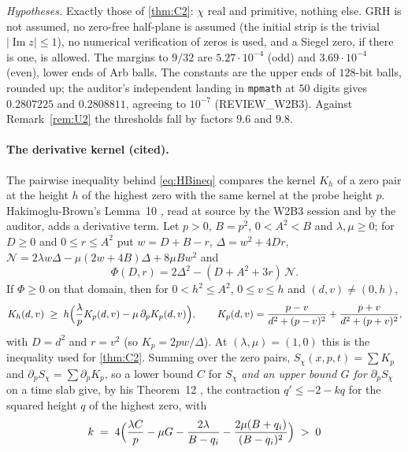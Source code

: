 \documentclass[11pt]{article}
\theoremstyle{definition}
\newcommand{\lean}[1]{\texttt{#1}}
\newcommand{\im}{\operatorname{Im}}
\begin{document}
\noindent
\emph{Hypotheses.} Exactly those of \cref{thm:C2}: $\chi$ real and primitive, nothing else. GRH is not assumed, no zero-free half-plane is assumed (the initial strip is the trivial $|\im z| \le 1$), no numerical verification of zeros is used, and a Siegel zero, if there is one, is allowed. The margins to $9/32$ are $5.27\cdot10^{-4}$ (odd) and $3.69\cdot10^{-4}$ (even), lower ends of Arb balls. The constants are the upper ends of $128$-bit balls, rounded up; the auditor's independent landing in \lean{mpmath} at $50$ digits gives $0.2807225$ and $0.2808811$, agreeing to $10^{-7}$ (REVIEW\_W2B3). Against Remark~\ref{rem:U2} the thresholds fall by factors $9.6$ and $9.8$.

\paragraph{The derivative kernel (cited).} The pairwise inequality behind \eqref{eq:HBineq} compares the kernel $K_h$ of a zero pair at the height $h$ of the highest zero with the same kernel at the probe height $p$. Hakimoglu-Brown's Lemma~10 \cite[p.~14, (25)--(26)]{HakimogluBrown2026}, read at source by the W2B3 session and by the auditor, adds a derivative term. Let $p > 0$, $B = p^2$, $0 < A^2 < B$ and $\lambda, \mu \ge 0$; for $D \ge 0$ and $0 \le r \le A^2$ put $w = D + B - r$, $\Delta = w^2 + 4Dr$, $\mathcal N = 2\lambda w\Delta - \mu(2w + 4B)\Delta + 8\mu Bw^2$ and
\begin{equation}\label{eq:HBphi}
\Phi(D, r) = 2\Delta^2 - (D + A^2 + 3r)\,\mathcal N .
\end{equation}
If $\Phi \ge 0$ on that domain, then for $0 < h^2 \le A^2$, $0 \le v \le h$ and $(d, v) \ne (0, h)$,
\[
K_h(d, v) \;\ge\; h\Bigl(\frac{\lambda}{p}K_p(d, v) - \mu\,\partial_pK_p(d, v)\Bigr),\qquad K_p(d, v) = \frac{p - v}{d^2 + (p-v)^2} + \frac{p + v}{d^2 + (p+v)^2},
\]
with $D = d^2$ and $r = v^2$ (so $K_p = 2pw/\Delta$). At $(\lambda, \mu) = (1, 0)$ this is the inequality used for \cref{thm:C2}. Summing over the zero pairs, $S_\chi(x, p, t) = \sum K_p$ and $\partial_pS_\chi = \sum\partial_pK_p$, so a lower bound $C$ for $S_\chi$ \emph{and an upper bound $G$ for $\partial_pS_\chi$} on a time slab give, by his Theorem~12 \cite[p.~17, (33)]{HakimogluBrown2026}, the contraction $q' \le -2 - kq$ for the squared height $q$ of the highest zero, with
\begin{equation}\label{eq:k33}
k \;=\; 4\Bigl(\frac{\lambda C}{p} - \mu G - \frac{2\lambda}{B - q_i} - \frac{2\mu(B + q_i)}{(B - q_i)^2}\Bigr) \;>\; 0
\end{equation}
\end{document}

